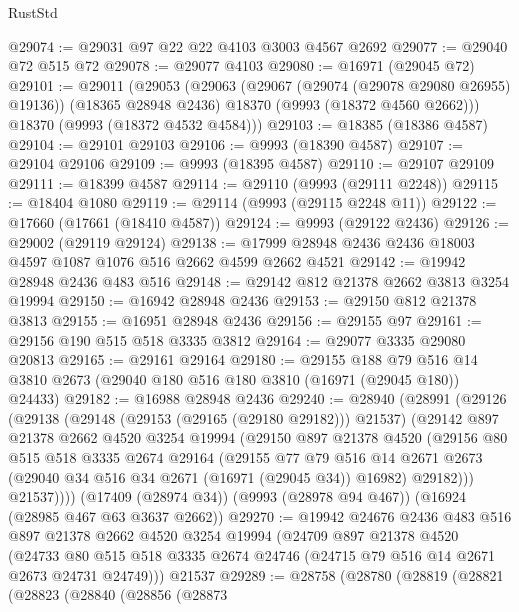 \begin{lexlean}{RustStd}
\begin{coremodule}
@29074 := @29031 @97 @22 @22 @4103 @3003 @4567 @2692
@29077 := @29040 @72 @515 @72
@29078 := @29077 @4103
@29080 := @16971 (@29045 @72)
@29101 := @29011
    (@29053
      (@29063
        (@29067 (@29074 (@29078 @29080 @26955) @19136))
        (@18365 @28948 @2436)
        @18370
        (@9993 (@18372 @4560 @2662)))
      @18370
      (@9993 (@18372 @4532 @4584)))
@29103 := @18385 (@18386 @4587)
@29104 := @29101 @29103
@29106 := @9993 (@18390 @4587)
@29107 := @29104 @29106
@29109 := @9993 (@18395 @4587)
@29110 := @29107 @29109
@29111 := @18399 @4587
@29114 := @29110 (@9993 (@29111 @2248))
@29115 := @18404 @1080
@29119 := @29114 (@9993 (@29115 @2248 @11))
@29122 := @17660 (@17661 (@18410 @4587))
@29124 := @9993 (@29122 @2436)
@29126 := @29002 (@29119 @29124)
@29138 := @17999 @28948 @2436 @2436 @18003 @4597 @1087 @1076 @516 @2662 @4599 @2662 @4521
@29142 := @19942 @28948 @2436 @483 @516
@29148 := @29142 @812 @21378 @2662 @3813 @3254 @19994
@29150 := @16942 @28948 @2436
@29153 := @29150 @812 @21378 @3813
@29155 := @16951 @28948 @2436
@29156 := @29155 @97
@29161 := @29156 @190 @515 @518 @3335 @3812
@29164 := @29077 @3335 @29080 @20813
@29165 := @29161 @29164
@29180 := @29155
    @188
    @79
    @516
    @14
    @3810
    @2673
    (@29040 @180 @516 @180 @3810 (@16971 (@29045 @180)) @24433)
@29182 := @16988 @28948 @2436
@29240 := @28940
    (@28991
      (@29126
        (@29138
          (@29148 (@29153 (@29165 (@29180 @29182))) @21537)
          (@29142
            @897
            @21378
            @2662
            @4520
            @3254
            @19994
            (@29150
              @897
              @21378
              @4520
              (@29156
                @80
                @515
                @518
                @3335
                @2674
                @29164
                (@29155
                  @77
                  @79
                  @516
                  @14
                  @2671
                  @2673
                  (@29040 @34 @516 @34 @2671 (@16971 (@29045 @34)) @16982)
                  @29182)))
            @21537))))
    (@17409 (@28974 @34))
    (@9993 (@28978 @94 @467))
    (@16924 (@28985 @467 @63 @3637 @2662))
@29270 := @19942
    @24676
    @2436
    @483
    @516
    @897
    @21378
    @2662
    @4520
    @3254
    @19994
    (@24709
      @897
      @21378
      @4520
      (@24733 @80 @515 @518 @3335 @2674 @24746 (@24715 @79 @516 @14 @2671 @2673 @24731 @24749)))
    @21537
@29289 := @28758
    (@28780
      (@28819
        (@28821
          (@28823
            (@28840
              (@28856
                (@28873

\end{coremodule}
\end{lexlean}
